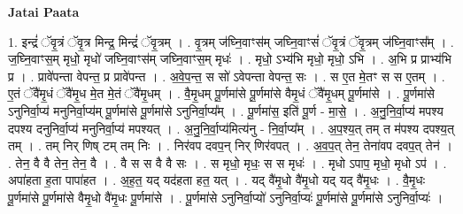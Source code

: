 \documentclass[17pt]{extarticle}
\begin{document}
\textbf{Jatai Paata} \newline

1. इन्द्रं॑ ॅवृ॒त्रं ॅवृ॒त्र मिन्द्र॒ मिन्द्रं॑ ॅवृ॒त्रम् । . वृ॒त्रम् ज॑घ्नि॒वाꣳस॑म् जघ्नि॒वाꣳसं॑ ॅवृ॒त्रं ॅवृ॒त्रम् ज॑घ्नि॒वाꣳस᳚म् । . ज॒घ्नि॒वाꣳस॒म् मृधो॒ मृधो॑ जघ्नि॒वाꣳस॑म् जघ्नि॒वाꣳस॒म् मृधः॑ । . मृधो॒ ऽभ्य॑भि मृधो॒ मृधो॒ ऽभि । . अ॒भि प्र प्राभ्य॑भि प्र । . प्रावे॑पन्ता वेपन्त॒ प्र प्रावे॑पन्त । . अ॒वे॒प॒न्त॒ स सो॑ ऽवेपन्ता वेपन्त॒ सः । . स ए॒त मे॒तꣳ स स ए॒तम् । . ए॒तं ॅवै॑मृ॒धं ॅवै॑मृ॒ध मे॒त मे॒तं ॅवै॑मृ॒धम् । . वै॒मृ॒धम् पू॒र्णमा॑से पू॒र्णमा॑से वैमृ॒धं ॅवै॑मृ॒धम् पू॒र्णमा॑से । . पू॒र्णमा॑से ऽनुनिर्वा॒प्य॑ मनुनिर्वा॒प्य॑म् पू॒र्णमा॑से पू॒र्णमा॑से ऽनुनिर्वा॒प्य᳚म् । . पू॒र्णमा॑स॒ इति॑ पू॒र्ण - मा॒से॒ । . अ॒नु॒नि॒र्वा॒प्य॑ मपश्य दपश्य दनुनिर्वा॒प्य॑ मनुनिर्वा॒प्य॑ मपश्यत् । . अ॒नु॒नि॒र्वा॒प्य॑मित्य॑नु - नि॒र्वा॒प्य᳚म् । . अ॒प॒श्य॒त् तम् त म॑पश्य दपश्य॒त् तम् । . तम् निर् णिष् टम् तम् निः । . निर॑वप दवप॒न् निर् णिर॑वपत् । . अ॒व॒प॒त् तेन॒ तेना॑वप दवप॒त् तेन॑ । . तेन॒ वै वै तेन॒ तेन॒ वै । . वै स स वै वै सः । . स मृधो॒ मृधः॒ स स मृधः॑ । . मृधो ऽपाप॒ मृधो॒ मृधो ऽप॑ । . अपा॑हता ह॒ता पापा॑हत । . अ॒ह॒त॒ यद् यद॑हता हत॒ यत् । . यद् वै॑मृ॒धो वै॑मृ॒धो यद् यद् वै॑मृ॒धः । . वै॒मृ॒धः पू॒र्णमा॑से पू॒र्णमा॑से वैमृ॒धो वै॑मृ॒धः पू॒र्णमा॑से । . पू॒र्णमा॑से ऽनुनिर्वा॒प्यो॑ ऽनुनिर्वा॒प्यः॑ पू॒र्णमा॑से पू॒र्णमा॑से ऽनुनिर्वा॒प्यः॑ । \newline
\end{document}
